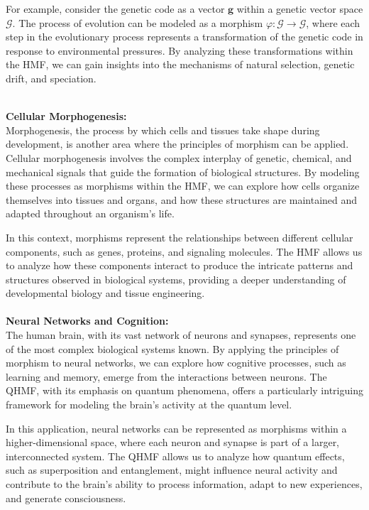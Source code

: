 \documentclass{article}
\begin{document}
For example, consider the genetic code as a vector \( \mathbf{g} \) within a genetic vector space \( \mathcal{G} \). The process of evolution can be modeled as a morphism \( \varphi: \mathcal{G} \to \mathcal{G} \), where each step in the evolutionary process represents a transformation of the genetic code in response to environmental pressures. By analyzing these transformations within the HMF, we can gain insights into the mechanisms of natural selection, genetic drift, and speciation.
\\
\

\textbf{Cellular Morphogenesis:}
\\

Morphogenesis, the process by which cells and tissues take shape during development, is another area where the principles of morphism can be applied. Cellular morphogenesis involves the complex interplay of genetic, chemical, and mechanical signals that guide the formation of biological structures. By modeling these processes as morphisms within the HMF, we can explore how cells organize themselves into tissues and organs, and how these structures are maintained and adapted throughout an organism's life.

In this context, morphisms represent the relationships between different cellular components, such as genes, proteins, and signaling molecules. The HMF allows us to analyze how these components interact to produce the intricate patterns and structures observed in biological systems, providing a deeper understanding of developmental biology and tissue engineering.
\\
\\

\textbf{Neural Networks and Cognition:}
\\

The human brain, with its vast network of neurons and synapses, represents one of the most complex biological systems known. By applying the principles of morphism to neural networks, we can explore how cognitive processes, such as learning and memory, emerge from the interactions between neurons. The QHMF, with its emphasis on quantum phenomena, offers a particularly intriguing framework for modeling the brain's activity at the quantum level.

In this application, neural networks can be represented as morphisms within a higher-dimensional space, where each neuron and synapse is part of a larger, interconnected system. The QHMF allows us to analyze how quantum effects, such as superposition and entanglement, might influence neural activity and contribute to the brain's ability to process information, adapt to new experiences, and generate consciousness.
\\
\\
\end{document}
